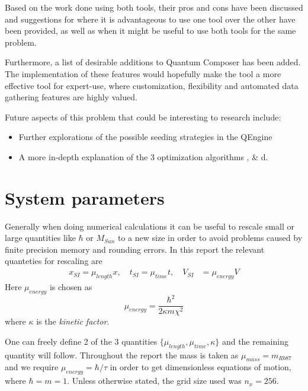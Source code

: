 \documentclass[a4paper, twocolumn]{revtex4-1}
\begin{document}
Based on the work done using both tools, their pros and cons have been discussed and suggestions for where it is advantageous to use one tool over the other have been provided, as well as when it might be useful to use both tools for the same problem.

Furthermore, a list of desirable additions to Quantum Composer has been added. The implementation of these features would hopefully make the tool a more effective tool for expert-use, where customization, flexibility and automated data gathering features are highly valued.

Future aspects of this problem that could be interesting to research include:
\begin{itemize}
	\item Further explorations of the possible seeding strategies in the QEngine
	\item A more in-depth explanation of the 3 optimization algorithms ,  \& d.
\end{itemize}



\appendix
\section{System parameters}\label{App:System-params}
Generally when doing numerical calculations it can be useful to rescale small or large quantities like $\hbar$ or $M_{Sun}$ to a new size in order to avoid problems caused by finite precision memory and rounding errors. In this report the relevant quanteties for rescaling are
\begin{align}
	x_{SI} = \mu_{length} x, \quad t_{SI} = \mu_{time} t, \quad V_{SI} &= \mu_{energy} V
\end{align}
Here $\mu_{energy}$ is chosen as 
\begin{equation}
	\mu_{energy} = \frac{\hbar^2}{2\kappa m \chi^2}
\end{equation}
where $\kappa$ is the \textit{kinetic factor}. 

One can freely define 2 of the 3 quantities $\{ \mu_{length},\mu_{time},\kappa \}$ and the remaining quantity will follow. Throughout the report the mass is taken as $\mu_{mass}=m_{Rb87}$ and we require $\mu_{energy} = \hbar / \tau$ in order to get dimensionless equations of motion, where $\hbar = m = 1$. Unless otherwise stated, the grid size used was $n_x = 256$. \\
\end{document}
